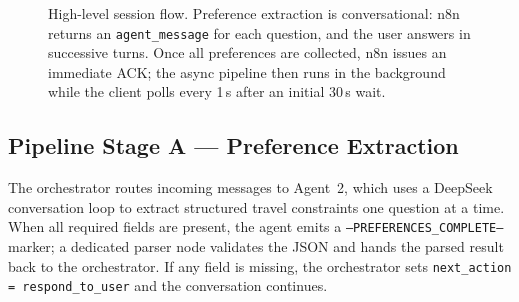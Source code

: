 \documentclass[12pt,a4paper]{report}
\begin{document}
\begin{figure}[H]
{
}%
\caption{High-level session flow. Preference extraction is conversational: n8n returns an
         \texttt{agent\_message} for each question, and the user answers in successive turns.
         Once all preferences are collected, n8n issues an immediate ACK; the async pipeline then
         runs in the background while the client polls every 1\,s after an initial 30\,s wait.}
\label{fig:seq-highlevel}
\end{figure}
 
\subsection{Pipeline Stage A --- Preference Extraction}
 
The orchestrator routes incoming messages to Agent~2, which uses a DeepSeek conversation loop to
extract structured travel constraints one question at a time. When all required fields are
present, the agent emits a \texttt{---PREFERENCES\_COMPLETE---} marker; a dedicated parser node
validates the JSON and hands the parsed result back to the orchestrator. If any field is missing,
the orchestrator sets \texttt{next\_action = respond\_to\_user} and the conversation continues.
 
\end{document}

